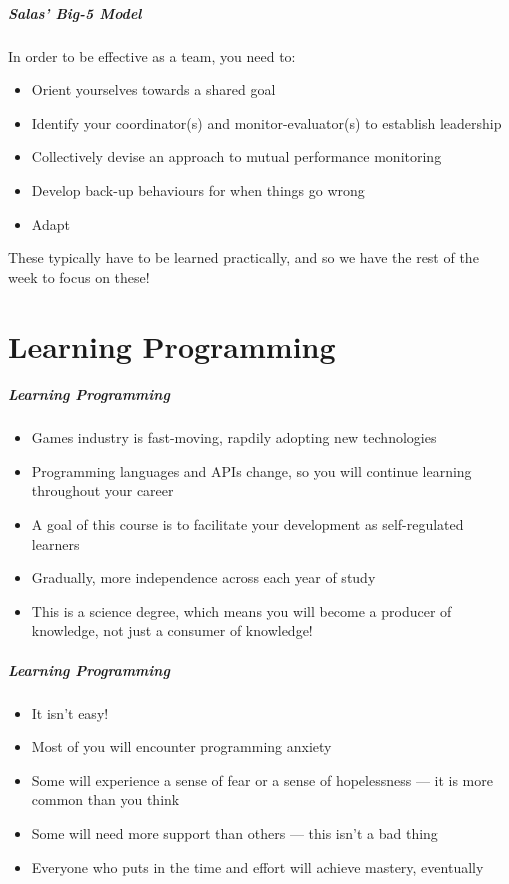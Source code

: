 \begin{frame}
	\frametitle{Salas' Big-5 Model}
	
	In order to be effective as a team, you need to:
	
	\begin{itemize}
		\item Orient yourselves towards a shared goal
		\item Identify your coordinator(s) and monitor-evaluator(s) to establish leadership 
		\item Collectively devise an approach to mutual performance monitoring
		\item Develop back-up behaviours for when things go wrong
		\item Adapt
	\end{itemize}
	
	These typically have to be learned practically, and so we have the rest of the week to focus on these!
	
\end{frame}

\part{Learning Programming}
\frame{\partpage}

\begin{frame}
	\frametitle{Learning Programming}
	
	\begin{itemize}
		\item Games industry is fast-moving, rapdily adopting new technologies
		\item Programming languages and APIs change, so you will continue learning throughout your career
		\item A goal of this course is to facilitate your development as self-regulated learners
		\item Gradually, more independence across each year of study
		\item This is a science degree, which means you will become a producer of knowledge, not just a consumer of knowledge!
	\end{itemize}
\end{frame}

\begin{frame}
	\frametitle{Learning Programming}
	
	\begin{itemize}
		\item It isn't easy!
		\item Most of you will encounter programming anxiety
		\item Some will experience a sense of fear or a sense of hopelessness --- it is more common than you think
		\item Some will need more support than others --- this isn't a bad thing
		\item Everyone who puts in the time and effort will achieve mastery, eventually
	\end{itemize}
\end{frame}

